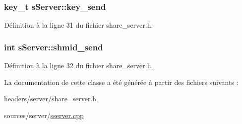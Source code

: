 \hypertarget{classs_server_a9300a483fb708e2e0208d5e1e53e0c97}{
\subsubsection[{key\-\_\-send}]{\setlength{\rightskip}{0pt plus 5cm}key\-\_\-t s\-Server\-::key\-\_\-send\hspace{0.3cm}{\ttfamily [private]}}}\label{classs_server_a9300a483fb708e2e0208d5e1e53e0c97}


Définition à la ligne 31 du fichier share\-\_\-server.\-h.

\hypertarget{classs_server_ab7c99a899b82ac73c36c30da01ab7944}{
\subsubsection[{shmid\-\_\-send}]{\setlength{\rightskip}{0pt plus 5cm}int s\-Server\-::shmid\-\_\-send\hspace{0.3cm}{\ttfamily [private]}}}\label{classs_server_ab7c99a899b82ac73c36c30da01ab7944}


Définition à la ligne 32 du fichier share\-\_\-server.\-h.



La documentation de cette classe a été générée à partir des fichiers suivants \-:\begin{DoxyCompactItemize}
\item 
headers/server/\hyperlink{share__server_8h}{share\-\_\-server.\-h}\item 
sources/server/\hyperlink{sserver_8cpp}{sserver.\-cpp}\end{DoxyCompactItemize}
